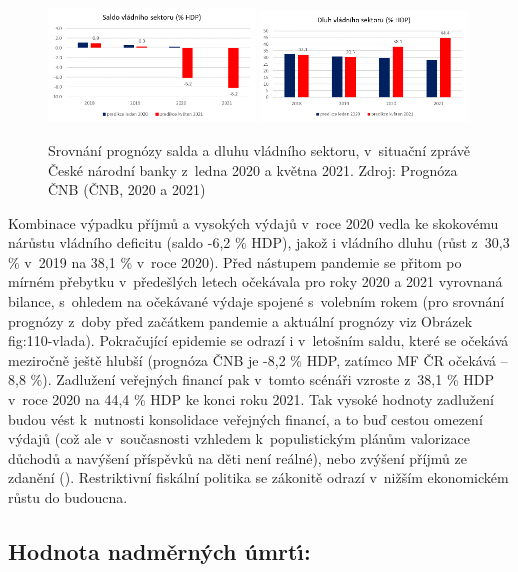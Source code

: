 \begin{figure}[ht]
    \centering
    \includegraphics[width=0.49\textwidth]{./pic/saldo.png} \includegraphics[width=0.49\textwidth]{./pic/dluh.png}
    \caption{Srovnání prognózy salda a dluhu vládního sektoru, v~situační zprávě České národní banky z~ledna 2020 a května 2021. Zdroj: Prognóza ČNB (ČNB, 2020 a 2021)}
    \label{fig:110-vlada}
\end{figure}

Kombinace výpadku příjmů a vysokých výdajů v~roce 2020 vedla ke skokovému nárůstu vládního deficitu (saldo -6,2 \% HDP), jakož i vládního dluhu (růst z~30,3 \% v~2019 na 38,1 \% v~roce 2020). Před nástupem pandemie se přitom po mírném přebytku v~předešlých letech očekávala pro roky 2020 a 2021 vyrovnaná bilance, s~ohledem na očekávané výdaje spojené s~volebním rokem (pro srovnání prognózy z~doby před začátkem pandemie a aktuální prognózy viz Obrázek fig:110-vlada). Pokračující epidemie se odrazí i v~letošním saldu, které se očekává meziročně ještě hlubší (prognóza ČNB je -8,2 \% HDP, zatímco MF ČR očekává – 8,8 \%). Zadlužení veřejných financí pak v~tomto scénáři vzroste z~38,1 \% HDP v~roce 2020 na 44,4 \% HDP ke konci roku 2021. Tak vysoké hodnoty zadlužení budou vést k~nutnosti konsolidace veřejných financí, a to buď cestou omezení výdajů (což ale v~současnosti vzhledem k~populistickým plánům valorizace důchodů a navýšení příspěvků na děti není reálné), nebo zvýšení příjmů ze zdanění (\cite{NRR2021}). Restriktivní fiskální politika se zákonitě odrazí v~nižším ekonomickém růstu do budoucna.

\subsection*{Hodnota nadm\v{e}rn\'{y}ch \'{u}mrt\'{\i}:} 

